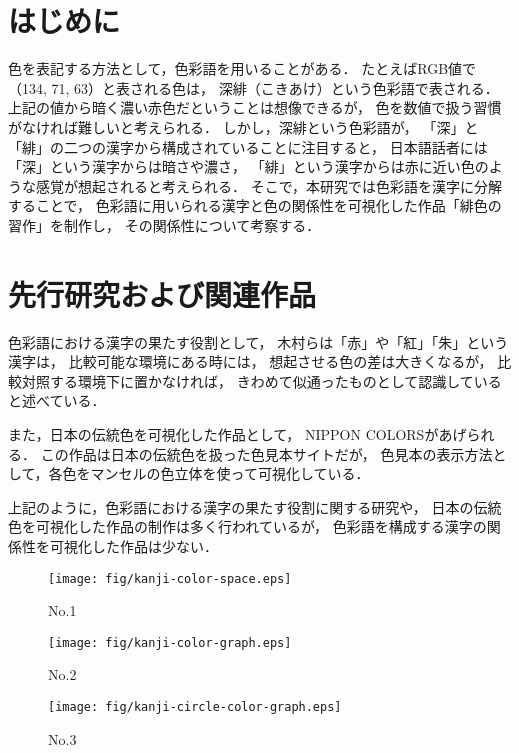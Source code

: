\documentclass[a4j,twocolumn]{ujarticle} %
\newcommand{\workname}{緋色の習作}
\newcommand{\colorname}{色彩語}
\newcommand{\mysection}[1]{\vspace{-23pt}\section{#1}\vspace{-5pt}}
\begin{document}
\maketitle
\thispagestyle{myheadings}

\mysection{はじめに}

色を表記する方法として，\colorname{}を用いることがある．
たとえばRGB値で（134, 71, 63）と表される色は，
深緋（こきあけ）という\colorname{}で表される．
上記の値から暗く濃い赤色だということは想像できるが，
色を数値で扱う習慣がなければ難しいと考えられる．
しかし，深緋という\colorname{}が，
「深」と「緋」の二つの漢字から構成されていることに注目すると，
日本語話者には「深」という漢字からは暗さや濃さ，
「緋」という漢字からは赤に近い色のような感覚が想起されると考えられる．
そこで，本研究では\colorname{}を漢字に分解することで，
\colorname{}に用いられる漢字と色の関係性を可視化した作品「\workname{}」を制作し，
その関係性について考察する．

\mysection{先行研究および関連作品}

色彩語における漢字の果たす役割として，
木村ら\cite{Kimura1998}は「赤」や「紅」「朱」という漢字は，
比較可能な環境にある時には，
想起させる色の差は大きくなるが，
比較対照する環境下に置かなければ，
きわめて似通ったものとして認識していると述べている．

また，日本の伝統色を可視化した作品として，
NIPPON COLORS\cite{NipponColors}があげられる．
この作品は日本の伝統色を扱った色見本サイトだが，
色見本の表示方法として，各色をマンセルの色立体を使って可視化している．

上記のように，色彩語における漢字の果たす役割に関する研究や，
日本の伝統色を可視化した作品の制作は多く行われているが，
色彩語を構成する漢字の関係性を可視化した作品は少ない．

\vspace{-1zh}

\begin{figure*}[h]
  \begin{center}
    \begin{minipage}{0.3\hsize}
      \begin{center}
        \texttt{[image: fig/kanji-color-space.eps]}
      \end{center}
      \caption{No.1}
      \label{fig:no1}
    \end{minipage}
    \begin{minipage}{0.3\hsize}
      \begin{center}
        \texttt{[image: fig/kanji-color-graph.eps]}
      \end{center}
      \caption{No.2}
      \label{fig:no2}
    \end{minipage}
    \begin{minipage}{0.3\hsize}
      \begin{center}
        \texttt{[image: fig/kanji-circle-color-graph.eps]}
      \end{center}
      \caption{No.3}
      \label{fig:no3}
    \end{minipage}
  \end{center}
\end{figure*}
\end{document}
